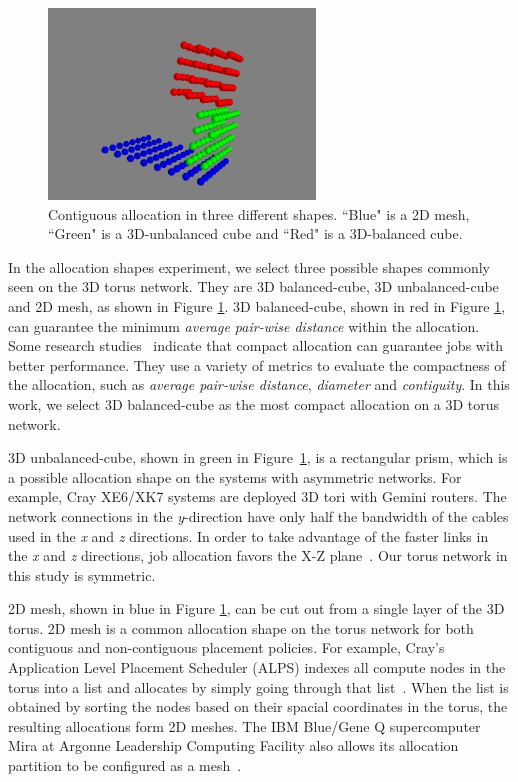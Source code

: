 \begin{figure}[t]
    \centering
        \includegraphics[height=2in]{figs/allocshape/allocation}
        \caption{Contiguous allocation in three different shapes. 
    ``Blue" is a 2D mesh, ``Green" is a 3D-unbalanced cube and ``Red" is a 3D-balanced cube. }
        \label{fig:cont_sub1}
\end{figure}

In the allocation shapes experiment, 
we select three possible shapes commonly seen on the 3D torus network. 
They are 3D balanced-cube, 3D unbalanced-cube and 2D mesh, 
as shown in Figure \ref{fig:cont_sub1}.
3D balanced-cube, shown in red in Figure \ref{fig:cont_sub1}, 
can guarantee the minimum \emph{average pair-wise distance} within the allocation. 
Some research studies~\cite{leung,abhinav-sc13} indicate that 
compact allocation can guarantee jobs with better performance. 
They use a variety of metrics to evaluate the compactness of the allocation, 
such as \emph{average pair-wise distance}, \emph{diameter} and \emph{contiguity}. 
In this work, we select 3D balanced-cube as the most compact allocation on a 3D torus network.

3D unbalanced-cube, shown in green in Figure~\ref{fig:cont_sub1}, 
is a rectangular prism, which is a possible allocation shape 
on the systems with asymmetric networks. 
For example, Cray XE6/XK7 systems are deployed 3D tori with Gemini routers. 
The network connections in the \emph{y}-direction have 
only half the bandwidth of the cables used in the \emph{x} and \emph{z} directions. 
In order to take advantage of the faster links in the \emph{x} and \emph{z} directions, 
job allocation favors the X-Z plane~\cite{RF}. Our torus network in this study is symmetric.

2D mesh, shown in blue in Figure \ref{fig:cont_sub1}, 
can be cut out from a single layer of the 3D torus. 
2D mesh is a common allocation shape on the torus network 
for both contiguous and non-contiguous placement policies. 
For example, Cray's Application Level Placement Scheduler (ALPS) indexes 
all compute nodes in the torus into a list and 
allocates by simply going through that list~\cite{carl-cug}. 
When the list is obtained by sorting the nodes based on 
their spacial coordinates in the torus, 
the resulting allocations form 2D meshes. 
The IBM Blue/Gene Q supercomputer Mira at Argonne Leadership Computing Facility 
also allows its allocation partition to be configured as a mesh~\cite{zhou-ipdps}. 


